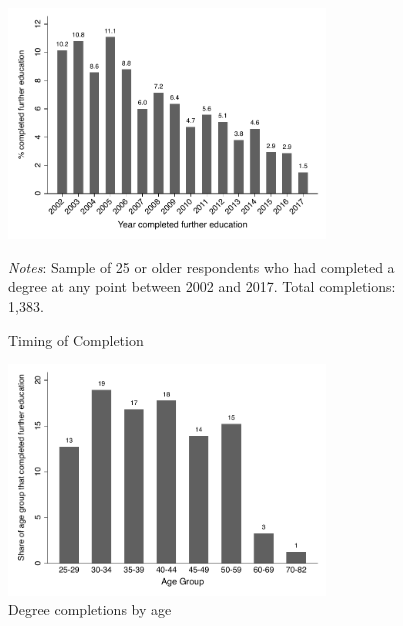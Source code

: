 \documentclass[12pt, a4paper]{article}
\begin{document}
\begin{figure}[H]
\centering
\caption{Timing of Completion}
\vspace{0.5cm}
  \label{fig:yearcomp}
    \includegraphics[width=0.75\textwidth]{_figures/year_completed.pdf}
    \parbox{1\textwidth}{\footnotesize{\textit{Notes}: Sample of 25 or older respondents who had completed a degree at any point between 2002 and 2017. Total completions: 1,383.}}
\end{figure}

\begin{figure}[H]
\centering
\caption{Degree completions by age}
\vspace{0.5cm}
  \label{fig:degbyage}
    \includegraphics[width=0.75\textwidth]{_figures/descriptive_fig3b_bw.pdf}
\end{figure}
\end{document}
